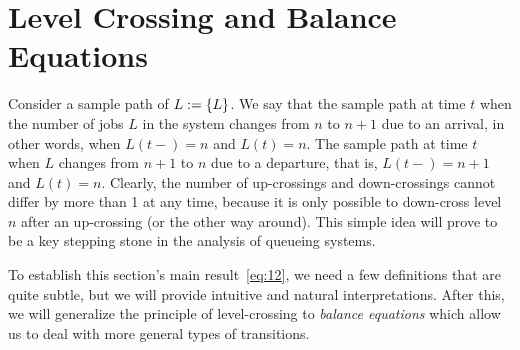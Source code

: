 


\section{Level Crossing and Balance Equations}
\label{sec:level-cross-balance}

Consider a sample path of $L:=\{L\}$.
We say that the sample path  at time $t$ when the  number of jobs $L$ in the system changes from $n$ to $n+1$ due to an arrival, in other words, when $L(t-)=n$ and $L(t)=n$. The sample path  at time $t$ when $L$ changes from $n+1$ to $n$ due to a departure, that is, $L(t-)=n+1$ and $L(t)=n$.
Clearly, the number of up-crossings and down-crossings cannot differ by more than 1 at any time, because it is only possible to down-cross level $n$ after an up-crossing (or the other way around).
This simple idea will prove to be a key stepping stone in the analysis of queueing systems.

To establish this section's main result~\cref{eq:12}, we need a few definitions that are quite subtle, but we will provide intuitive and natural interpretations.
After this, we will generalize the principle of level-crossing to \emph{balance equations} which allow us to deal with more general types of transitions.

